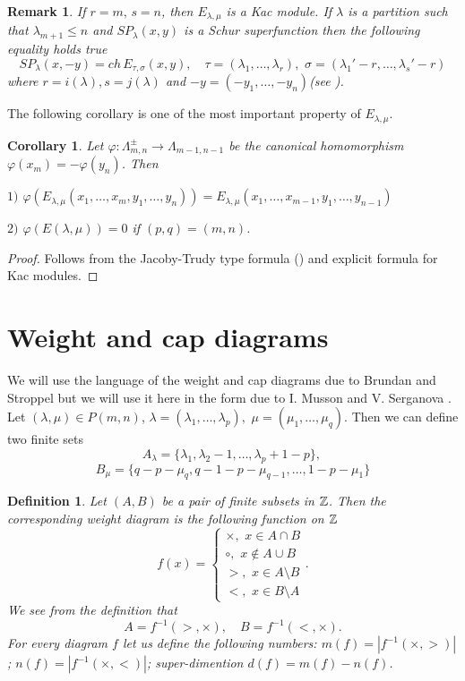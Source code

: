 \documentclass[12pt,reqno]{amsart}
\newtheorem{corollary}[thm]{Corollary}
\newtheorem{definition}[thm]{Definition}
\newtheorem{remark}[thm]{Remark}
\begin{document}
\begin{remark}
If $r=m,\,s=n $, then $E_{\lambda,\mu}$ is  a Kac module. If $\lambda$ is  a partition such that $\lambda_{m+1}\le n$ and $SP_{\lambda}(x,y)$ is  a Schur  superfunction then the following equality holds true
$$
SP_{\lambda}(x,-y)=ch\,E_{\tau,\sigma}(x,y),\quad \tau=(\lambda_1,\dots,\lambda_r),\,\,\sigma=(\lambda_1'-r,\dots,\lambda_s'-r)
$$
where $r=i(\lambda),s=j(\lambda)$ and $-y=(-y_1,\dots,-y_n)$(see \cite{SV2}).
 \end{remark}
The following corollary is one of the most important property of $E_{\lambda,\mu}$.
\begin{corollary}\label{stab} Let $\varphi: \Lambda_{m,n}^{\pm}\rightarrow \Lambda_{m-1,n-1}$ be the canonical homomorphism $\varphi(x_m)=-\varphi(y_n)$. Then 

$1)$
$
\varphi(E_{\lambda,\mu}(x_1,\dots,x_m,y_1,\dots,y_n))=E_{\lambda,\mu}(x_1,\dots,x_{m-1},y_1,\dots,y_{n-1})
$

$2)$  $\varphi(E(\lambda,\mu))=0$ if $(p,q)=(m,n)$.
\end{corollary} 
\begin{proof}Follows from the Jacoby-Trudy type formula (\cite{Ser}) and explicit formula for Kac modules.
\end{proof}

\section{Weight and cap diagrams}



We will use the language of the weight  and cap diagrams due to Brundan and Stroppel  \cite{BS}  but we will use it here in the  form due to I. Musson and V. Serganova \cite{MS}.
Let $(\lambda,\mu)\in P(m,n)$,
$
\lambda=(\lambda_1,\dots,\lambda_p),\,\,\mu=(\mu_1,\dots,\mu_q)
$.
 Then we can define two finite sets
$$
 A_{\lambda}=\{\lambda_1,\lambda_2-1,\dots,\lambda_p+1-p\},\,
 $$
 $$
 B_{\mu}=\{q-p-\mu_q,q-1-p-\mu_{q-1},\dots,1-p-\mu_1\}
$$
\begin{definition}\label{weight}Let $(A,B)$ be a pair of finite  subsets in $\Bbb Z$.  Then the  corresponding weight  diagram is the following function on $\Bbb Z$
$$
f(x)=\begin{cases} \times,\,\,x\in A\cap B\\
\circ,\,\,x\notin A\cup B\\
>,\,\,x\in A\setminus B\\
<,\,\, x\in B\setminus A
\end{cases}.
$$
We see from the definition that
$$
A=f^{-1}(>,\times),\quad B=f^{-1}(<,\times).
$$
For every diagram $f$ let us  define the following numbers:  $m(f)=|f^{-1}(\times,>)|$; $n(f)=|f^{-1}(\times,<)|$; super-dimention $d(f)=m(f)-n(f)$.
\end{definition}
\end{document}
